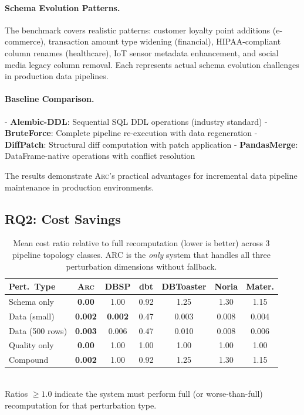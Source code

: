 \documentclass[sigplan,screen,nonacm]{acmart}
\newcommand{\arc}{\textsc{Arc}\xspace}
\begin{document}
\paragraph{Schema Evolution Patterns.}
The benchmark covers realistic patterns: customer loyalty point additions 
(e-commerce), transaction amount type widening (financial), HIPAA-compliant 
column renames (healthcare), IoT sensor metadata enhancement, and social media 
legacy column removal. Each represents actual schema evolution challenges 
in production data pipelines.

\paragraph{Baseline Comparison.}
- \textbf{Alembic-DDL}: Sequential SQL DDL operations (industry standard)
- \textbf{BruteForce}: Complete pipeline re-execution with data regeneration  
- \textbf{DiffPatch}: Structural diff computation with patch application
- \textbf{PandasMerge}: DataFrame-native operations with conflict resolution

The results demonstrate \arc's practical advantages for incremental data 
pipeline maintenance in production environments.

\subsection{RQ2: Cost Savings}

\begin{table}[t]
\caption{Mean cost ratio relative to full recomputation (lower is better)
  across 3 pipeline topology classes.  ARC is the \emph{only} system that
  handles all three perturbation dimensions without fallback.}
\label{tab:cost}
\centering\small
\begin{tabular}{@{}lcccccc@{}}
\toprule
\textbf{Pert.\ Type} &
  \textbf{\arc} &
  \textbf{DBSP} &
  \textbf{dbt} &
  \textbf{DBToaster} &
  \textbf{Noria} &
  \textbf{Mater.} \\
\midrule
Schema only   & \textbf{0.00} & 1.00 & 0.92 & 1.25 & 1.30 & 1.15 \\
Data (small)  & \textbf{0.002} & \textbf{0.002} & 0.47 & 0.003 & 0.008 & 0.004 \\
Data (500 rows) & \textbf{0.003} & 0.006 & 0.47 & 0.010 & 0.008 & 0.006 \\
Quality only  & \textbf{0.00} & 1.00 & 1.00 & 1.00 & 1.00 & 1.00 \\
Compound      & \textbf{0.002} & 1.00 & 0.92 & 1.25 & 1.30 & 1.15 \\
\bottomrule
\end{tabular}\\[4pt]
{\footnotesize Ratios $\geq 1.0$ indicate the system must perform full (or
worse-than-full) recomputation for that perturbation type.}
\end{table}
\end{document}
